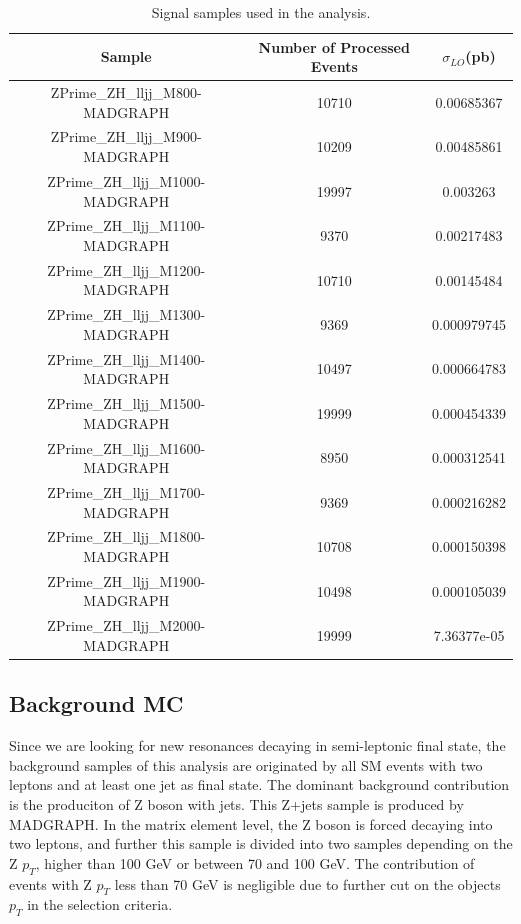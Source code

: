 \begin{center}
  \begin{table}
    \begin{center}
      \begin{tabular}{|c|c|c|}
        \hline
        Sample & Number of Processed Events & $\sigma_{LO}$(pb) \\ \hline
        ZPrime\_ZH\_lljj\_M800-MADGRAPH & 10710 & 0.00685367 \\ \hline
        ZPrime\_ZH\_lljj\_M900-MADGRAPH & 10209 & 0.00485861 \\ \hline
        ZPrime\_ZH\_lljj\_M1000-MADGRAPH & 19997 & 0.003263 \\ \hline
        ZPrime\_ZH\_lljj\_M1100-MADGRAPH & 9370 & 0.00217483 \\ \hline
        ZPrime\_ZH\_lljj\_M1200-MADGRAPH & 10710 & 0.00145484 \\ \hline
        ZPrime\_ZH\_lljj\_M1300-MADGRAPH & 9369 & 0.000979745 \\ \hline
        ZPrime\_ZH\_lljj\_M1400-MADGRAPH & 10497 & 0.000664783 \\ \hline
        ZPrime\_ZH\_lljj\_M1500-MADGRAPH & 19999 & 0.000454339 \\ \hline
        ZPrime\_ZH\_lljj\_M1600-MADGRAPH & 8950 & 0.000312541 \\ \hline
        ZPrime\_ZH\_lljj\_M1700-MADGRAPH & 9369 & 0.000216282 \\ \hline
        ZPrime\_ZH\_lljj\_M1800-MADGRAPH & 10708 & 0.000150398 \\ \hline
        ZPrime\_ZH\_lljj\_M1900-MADGRAPH & 10498 & 0.000105039 \\ \hline
        ZPrime\_ZH\_lljj\_M2000-MADGRAPH & 19999 & 7.36377e-05 \\
        \hline
      \end{tabular}
    \end{center}
    \caption{\label{tab:TableSignalMC}Signal samples used in the analysis.}    
  \end{table}
\end{center}
\newpage
\subsection{Background MC}
Since we are looking for new resonances decaying in semi-leptonic final state, the background samples of this analysis are originated by all SM events with two leptons and at least one jet as final state. The dominant background contribution is the produciton of Z boson with jets. This Z+jets sample is produced by MADGRAPH. In the matrix element level, the Z boson is forced decaying into two leptons, and further this sample is divided into two samples depending on the Z $p_{T}$, higher than 100 GeV or between 70 and 100 GeV. The contribution of events with Z $p_{T}$ less than 70 GeV is negligible due to further cut on the objects $p_{T}$ in the selection criteria.

